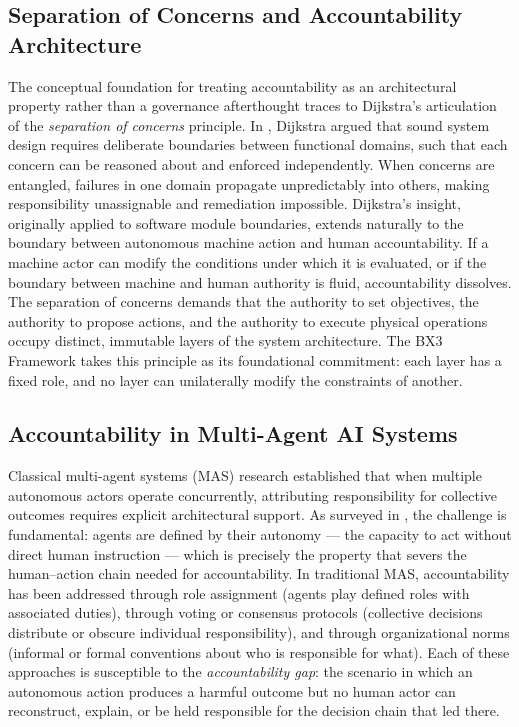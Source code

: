 \documentclass[12pt]{article}
\begin{document}
\subsection{Separation of Concerns and Accountability Architecture}

The conceptual foundation for treating accountability as an architectural property rather than a governance afterthought traces to Dijkstra's articulation of the \textit{separation of concerns} principle. In \cite{dijkstra1982}, Dijkstra argued that sound system design requires deliberate boundaries between functional domains, such that each concern can be reasoned about and enforced independently. When concerns are entangled, failures in one domain propagate unpredictably into others, making responsibility unassignable and remediation impossible. Dijkstra's insight, originally applied to software module boundaries, extends naturally to the boundary between autonomous machine action and human accountability. If a machine actor can modify the conditions under which it is evaluated, or if the boundary between machine and human authority is fluid, accountability dissolves. The separation of concerns demands that the authority to set objectives, the authority to propose actions, and the authority to execute physical operations occupy distinct, immutable layers of the system architecture. The BX3 Framework takes this principle as its foundational commitment: each layer has a fixed role, and no layer can unilaterally modify the constraints of another.

\subsection{Accountability in Multi-Agent AI Systems}

Classical multi-agent systems (MAS) research established that when multiple autonomous actors operate concurrently, attributing responsibility for collective outcomes requires explicit architectural support. As surveyed in \cite{trist1981}, the challenge is fundamental: agents are defined by their autonomy --- the capacity to act without direct human instruction --- which is precisely the property that severs the human--action chain needed for accountability. In traditional MAS, accountability has been addressed through role assignment (agents play defined roles with associated duties), through voting or consensus protocols (collective decisions distribute or obscure individual responsibility), and through organizational norms (informal or formal conventions about who is responsible for what). Each of these approaches is susceptible to the \textit{accountability gap}: the scenario in which an autonomous action produces a harmful outcome but no human actor can reconstruct, explain, or be held responsible for the decision chain that led there.
\end{document}
